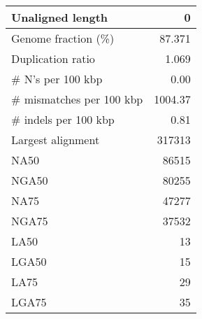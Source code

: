\documentclass[12pt,a4paper]{article}
\begin{document}
\begin{table}[ht]
\begin{center}
\begin{tabular}{|l*{1}{|r}|}
Unaligned length & 0 \\ \hline
Genome fraction (\%) & 87.371 \\ \hline
Duplication ratio & 1.069 \\ \hline
\# N's per 100 kbp & 0.00 \\ \hline
\# mismatches per 100 kbp & 1004.37 \\ \hline
\# indels per 100 kbp & 0.81 \\ \hline
Largest alignment & 317313 \\ \hline
NA50 & 86515 \\ \hline
NGA50 & 80255 \\ \hline
NA75 & 47277 \\ \hline
NGA75 & 37532 \\ \hline
LA50 & 13 \\ \hline
LGA50 & 15 \\ \hline
LA75 & 29 \\ \hline
LGA75 & 35 \\ \hline
\end{tabular}
\end{center}
\end{table}
\end{document}
